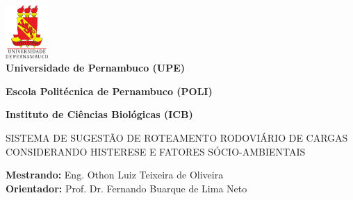 
\thispagestyle{empty}

\begin{center}

\includegraphics[height=20mm]{Figuras/Capa/brasao_upe.eps}\\


{\textbf{Universidade de Pernambuco (UPE)}}%

{\textbf{Escola Politécnica de Pernambuco (POLI)}}%

{\textbf{Instituto de Ciências Biológicas (ICB)}} \\ \vspace{2ex}

\vspace{1ex}

\vspace{1.3in}

{\Large SISTEMA DE SUGESTÃO DE ROTEAMENTO RODOVIÁRIO DE CARGAS CONSIDERANDO HISTERESE E FATORES SÓCIO-AMBIENTAIS } \\ 

\vspace{0.3in}


\vspace{1.2ex}

\begin{center}

\vspace{1ex} {\textbf{Mestrando:} Eng. Othon Luiz Teixeira de Oliveira \\
	      \textbf{Orientador:} Prof. Dr. Fernando Buarque de Lima Neto }


\end{center}
\end{center}
